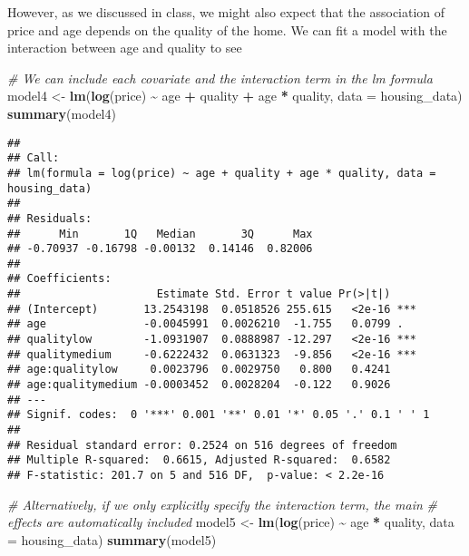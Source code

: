 \documentclass[
]{article}
\newenvironment{Shaded}{\begin{snugshade}}{\end{snugshade}}
\newcommand{\AttributeTok}[1]{\textcolor[rgb]{0.13,0.29,0.53}{#1}}
\newcommand{\CommentTok}[1]{\textcolor[rgb]{0.56,0.35,0.01}{\textit{#1}}}
\newcommand{\FunctionTok}[1]{\textcolor[rgb]{0.13,0.29,0.53}{\textbf{#1}}}
\newcommand{\NormalTok}[1]{#1}
\newcommand{\OtherTok}[1]{\textcolor[rgb]{0.56,0.35,0.01}{#1}}
\newcommand{\SpecialCharTok}[1]{\textcolor[rgb]{0.81,0.36,0.00}{\textbf{#1}}}
\begin{document}
However, as we discussed in class, we might also expect that the
association of price and age depends on the quality of the home. We can
fit a model with the interaction between age and quality to see

\begin{Shaded}
\begin{Highlighting}[]
\CommentTok{\# We can include each covariate and the interaction term in the lm formula}
\NormalTok{model4 }\OtherTok{\textless{}{-}} \FunctionTok{lm}\NormalTok{(}\FunctionTok{log}\NormalTok{(price) }\SpecialCharTok{\textasciitilde{}}\NormalTok{ age }\SpecialCharTok{+}\NormalTok{ quality }\SpecialCharTok{+}\NormalTok{ age }\SpecialCharTok{*}\NormalTok{ quality, }\AttributeTok{data =}\NormalTok{ housing\_data)}
\FunctionTok{summary}\NormalTok{(model4)}
\end{Highlighting}
\end{Shaded}

\begin{verbatim}
## 
## Call:
## lm(formula = log(price) ~ age + quality + age * quality, data = housing_data)
## 
## Residuals:
##      Min       1Q   Median       3Q      Max 
## -0.70937 -0.16798 -0.00132  0.14146  0.82006 
## 
## Coefficients:
##                     Estimate Std. Error t value Pr(>|t|)    
## (Intercept)       13.2543198  0.0518526 255.615   <2e-16 ***
## age               -0.0045991  0.0026210  -1.755   0.0799 .  
## qualitylow        -1.0931907  0.0888987 -12.297   <2e-16 ***
## qualitymedium     -0.6222432  0.0631323  -9.856   <2e-16 ***
## age:qualitylow     0.0023796  0.0029750   0.800   0.4241    
## age:qualitymedium -0.0003452  0.0028204  -0.122   0.9026    
## ---
## Signif. codes:  0 '***' 0.001 '**' 0.01 '*' 0.05 '.' 0.1 ' ' 1
## 
## Residual standard error: 0.2524 on 516 degrees of freedom
## Multiple R-squared:  0.6615, Adjusted R-squared:  0.6582 
## F-statistic: 201.7 on 5 and 516 DF,  p-value: < 2.2e-16
\end{verbatim}

\begin{Shaded}
\begin{Highlighting}[]
\CommentTok{\# Alternatively, if we only explicitly specify the interaction term, the main}
\CommentTok{\# effects are automatically included}
\NormalTok{model5 }\OtherTok{\textless{}{-}} \FunctionTok{lm}\NormalTok{(}\FunctionTok{log}\NormalTok{(price) }\SpecialCharTok{\textasciitilde{}}\NormalTok{ age }\SpecialCharTok{*}\NormalTok{ quality, }\AttributeTok{data =}\NormalTok{ housing\_data)}
\FunctionTok{summary}\NormalTok{(model5)}
\end{Highlighting}
\end{Shaded}
\end{document}
